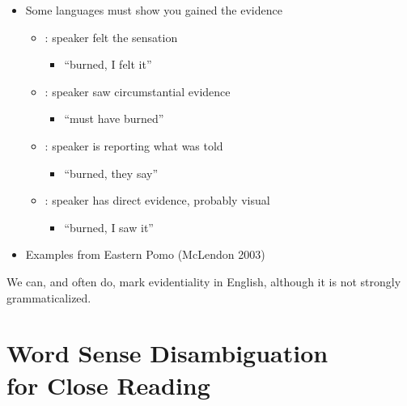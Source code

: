 \documentclass[a4paper,landscape,headrule,footrule,xetex]{foils}
\begin{document}
\begin{itemize}
\item  Some languages must show you gained the evidence
\begin{itemize}\addtolength{\itemsep}{1.5ex}
\item  {}:  speaker felt the sensation
  \begin{itemize}
  \item  {}  ``burned, I felt it''
  \end{itemize}
\item  {}: speaker saw circumstantial evidence 
  \begin{itemize}
  \item  {}  ``must have burned''
  \end{itemize}
\item  {}:   speaker is reporting what was told
  \begin{itemize}
  \item  {} ``burned, they say''
  \end{itemize}
\item  {}:   speaker has direct evidence, probably visual 
  \begin{itemize}
  \item {} ``burned, I saw it''
  \end{itemize}
\end{itemize}
\item Examples from Eastern Pomo (McLendon 2003)
\end{itemize}


We can, and often do, mark evidentiality in English, although it is
not strongly grammaticalized.

\begin{exe}
\ex {}
\ex {}
\ex {}
\ex {}
\ex {}
\ex {}
\ex {}
\end{exe}



\section{Word Sense Disambiguation \\ for Close Reading}
\end{document}
